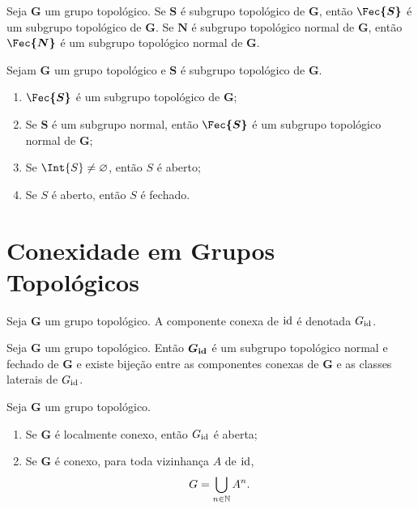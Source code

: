 \begin{prop}
Seja $\bm G$ um grupo topológico. Se $\bm S$ é subgrupo topológico de $\bm G$, então $\bm{\Fec{S}}$ é um subgrupo topológico de $\bm G$. Se $\bm N$ é subgrupo topológico normal de $\bm G$, então $\bm{\Fec{N}}$ é um subgrupo topológico normal de $\bm G$.
\end{prop}

\begin{prop}
Sejam $\bm G$ um grupo topológico e $\bm S$ é subgrupo topológico de $\bm G$.
	\begin{enumerate}
	\item $\bm{\Fec{S}}$ é um subgrupo topológico de $\bm G$;
	\item Se $\bm S$ é um subgrupo normal, então $\bm{\Fec{S}}$ é um subgrupo topológico normal de $\bm G$;
	\item Se $\Int{S} \neq \emptyset$, então $S$ é aberto;
	\item Se $S$ é aberto, então $S$ é fechado.
	\end{enumerate}
\end{prop}

\section{Conexidade em Grupos Topológicos}

\begin{defi}
Seja $\bm G$ um grupo topológico. A componente conexa de $\mathrm{id}$ é denotada $G_{\mathrm{id}}$.
\end{defi}

\begin{prop}
Seja $\bm G$ um grupo topológico. Então $\bm{G_{\mathrm{id}}}$ é um subgrupo topológico normal e fechado de $\bm G$ e existe bijeção entre as componentes conexas de $\bm G$ e as classes laterais de $G_{\mathrm{id}}$.
\end{prop}

\begin{prop}
Seja $\bm G$ um grupo topológico.
	\begin{enumerate}
	\item Se $\bm G$ é localmente conexo, então $G_{\mathrm{id}}$ é aberta;
	\item Se $\bm G$ é conexo, para toda vizinhança $A$ de $\mathrm{id}$,
		\begin{equation*}
		G = \bigcup_{n \in \mathbb{N}} A^n.
		\end{equation*}
	\end{enumerate} 
\end{prop}

